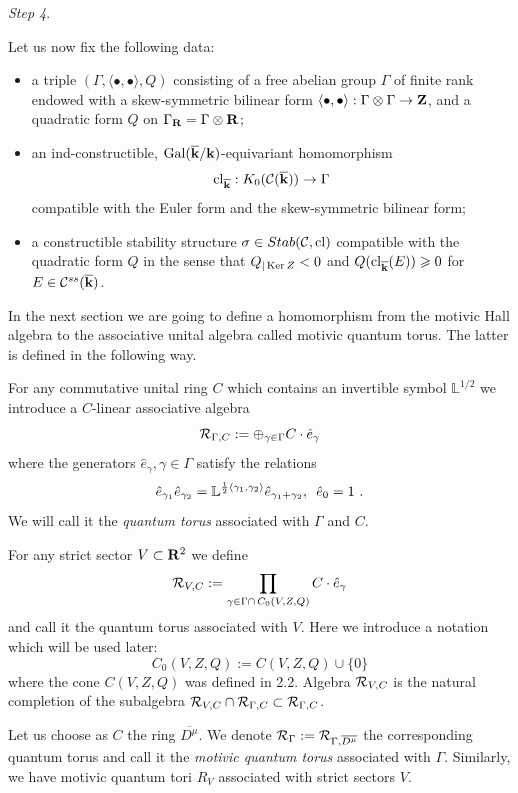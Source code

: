 \documentclass[12pt]{article}
\begin{document}
{\it Step 4}.

Let us now fix the following data:
\begin{itemize}
\item{a triple $(\Gamma, \langle\bullet,\bullet \rangle, Q)$ consisting of a free abelian group $\Gamma$
of finite rank endowed with a skew-symmetric bilinear form $\langle\bullet,\bullet \rangle: \Gamma\otimes \Gamma\to {\bf Z}$, and a quadratic form $Q$ on $\Gamma_{{\bf R}}=\Gamma\otimes {\bf R}$;}


\item{an ind-constructible, $\operatorname{Gal}({\overline{{\bf k}}}/{\bf k})$-equivariant homomorphism $$\operatorname{cl}_{{\overline{\bf k}}}: K_0({\mathcal C}({\overline{\bf k}}))\to \Gamma$$ compatible with the Euler form and the skew-symmetric bilinear form;}

\item{a constructible stability structure $\sigma\in Stab({\mathcal C},\operatorname{cl})$ compatible with the quadratic form $Q$ in the sense that $Q_{|\operatorname{Ker}Z}<0$ and $Q(\operatorname{cl}_{{\overline{\bf k}}}(E))\geqslant 0$ for $E\in {\mathcal C}^{ss}(\overline{{\bf k}})$.}
\end{itemize}

In the next section we are going to define a homomorphism from the motivic Hall algebra to the associative unital algebra called motivic quantum torus. The latter is defined in the following way.


For any commutative unital ring $C$ which contains an invertible symbol ${\mathbb L}^{1/2}$ we introduce a $C$-linear associative algebra 
$${\cal R}_{\Gamma,C}:=\oplus_{\gamma\in \Gamma}C\cdot \hat{e}_{\gamma}$$
 where the generators $\hat{e}_{\gamma}, \gamma\in \Gamma$ satisfy the relations 
$$\hat{e}_{\gamma_1}\hat{e}_{\gamma_2}={\mathbb L}^{{1\over{2}}\langle \gamma_1,\gamma_2\rangle}\hat{e}_{\gamma_1+\gamma_2}, \,\,\,\hat{e}_0=1\,\,.$$
 We will call it the  {\it quantum torus} associated with $\Gamma$ and $C$. 
 
For any strict sector $V\subset {\bf R}^2$ we define
$${\cal R}_{V,C}:=\prod_{\gamma \in \Gamma\cap \,C_0(V,Z,Q)}C\cdot \hat{e}_{\gamma}$$
and call it the quantum torus associated with $V$. Here we introduce a notation which will be used later:
$$C_0(V,Z,Q):=C(V,Z,Q)\cup \{0\}$$ 
where the cone $C(V,Z,Q)$ was defined in 2.2.
Algebra  ${\cal R}_{V,C}$ is the natural completion of the subalgebra  ${\cal R}_{V,C}\cap {\cal R}_{\Gamma,C}\subset{\cal R}_{\Gamma,C}$.

Let us choose as $C$ the ring $\overline{D^{\mu}}$. We denote ${\cal R}_{\Gamma}:={\cal R}_{\Gamma, \overline{D^{\mu}}}$
the corresponding quantum torus and call it the {\it motivic quantum torus} associated with $\Gamma$. Similarly, we have motivic quantum tori $R_V$ associated with strict sectors $V$.
\end{document}
